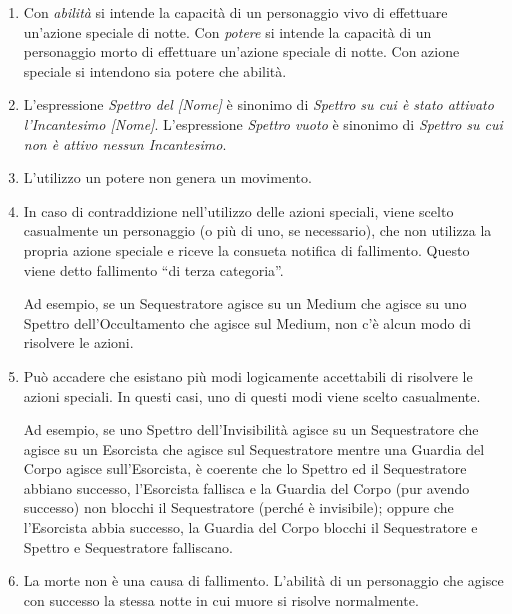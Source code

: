 \documentclass[a4paper,10pt]{article}
\begin{document}
\begin{enumerate}

	\item Con \emph{abilità} si intende la capacità di un personaggio vivo di effettuare un'azione speciale di notte. Con \emph{potere} si intende la capacità di un personaggio morto di effettuare un'azione speciale di notte. Con azione speciale si intendono sia potere che abilità.

	\item L'espressione \emph{Spettro del [Nome]} è sinonimo di \emph{Spettro su cui è stato attivato l'Incantesimo [Nome]}. L'espressione \emph{Spettro vuoto} è sinonimo di \emph{Spettro su cui non è attivo nessun Incantesimo}.

	\item L'utilizzo un potere non genera un movimento.

	\item In caso di contraddizione nell'utilizzo delle azioni speciali, viene scelto casualmente un personaggio (o più di uno, se necessario), che non utilizza la propria azione speciale e riceve la consueta notifica di fallimento. Questo viene detto fallimento ``di terza categoria''.

	      Ad esempio, se un Sequestratore agisce su un Medium che agisce su uno Spettro dell'Occultamento che agisce sul Medium, non c'è alcun modo di risolvere le azioni.

	\item Può accadere che esistano più modi logicamente accettabili di risolvere le azioni speciali. In questi casi, uno di questi modi viene scelto casualmente.

	      Ad esempio, se uno Spettro dell'Invisibilità agisce su un Sequestratore che agisce su un Esorcista che agisce sul Sequestratore mentre una Guardia del Corpo agisce sull'Esorcista, è coerente che lo Spettro ed il Sequestratore abbiano successo, l'Esorcista fallisca e la Guardia del Corpo (pur avendo successo) non blocchi il Sequestratore (perché è invisibile); oppure che l'Esorcista abbia successo, la Guardia del Corpo blocchi il Sequestratore e Spettro e Sequestratore falliscano.

	\item La morte non è una causa di fallimento. L'abilità di un personaggio che agisce con successo la stessa notte in cui muore si risolve normalmente.


\end{enumerate}
\end{document}
